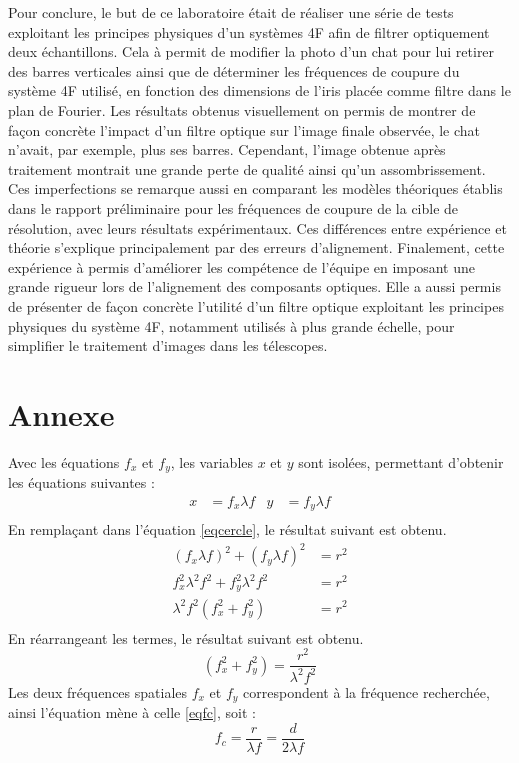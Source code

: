 \documentclass[11pt,letterpaper]{article}
\begin{document}
Pour conclure, le but de ce laboratoire était de réaliser une série de tests exploitant les principes physiques d'un systèmes 4F afin de filtrer optiquement deux échantillons. Cela à permit de modifier la photo d'un chat pour lui retirer des barres verticales ainsi que de déterminer les fréquences de coupure du système 4F utilisé, en fonction des dimensions de l'iris placée comme filtre dans le plan de Fourier. Les résultats obtenus visuellement on permis de montrer de façon concrète l'impact d'un filtre optique sur l'image finale observée, le chat n'avait, par exemple, plus ses barres. Cependant, l'image obtenue après traitement montrait une grande perte de qualité ainsi qu'un assombrissement. Ces imperfections se remarque aussi en comparant les modèles théoriques établis dans le rapport préliminaire pour les fréquences de coupure de la cible de résolution, avec leurs résultats expérimentaux. Ces différences entre expérience et théorie s'explique principalement par des erreurs d'alignement. Finalement, cette expérience à permis d'améliorer les compétence de l'équipe en imposant une grande rigueur lors de l'alignement des composants optiques. Elle a aussi permis de présenter de façon concrète l'utilité d'un filtre optique exploitant les principes physiques du système 4F, notamment utilisés à plus grande échelle, pour simplifier le traitement d'images dans les télescopes. 

\newpage\section*{Annexe}
Avec les équations $f_{x}$ et $f_{y}$, les variables $x$ et $y$ sont isolées, permettant d'obtenir les équations suivantes :
\begin{align*}
  x&=f_{x}\lambda f & y&=f_{y}\lambda f \\
\end{align*}
En remplaçant dans l'équation \ref{eqcercle}, le résultat suivant est obtenu.
\begin{align*}
  (f_{x}\lambda f)^{2}+(f_{y}\lambda f)^{2}&=r^{2} \\
  f_{x}^{2}\lambda^{2}f^{2}+f_{y}^{2}\lambda^{2}f^{2}&=r^{2} \\
  \lambda^{2}f^{2}(f_{x}^{2}+f_{y}^{2})&=r^{2} \\
\end{align*}
En réarrangeant les termes, le résultat suivant est obtenu.
\begin{equation*}
  (f_{x}^{2}+f_{y}^{2})=\frac{r^{2}}{\lambda^{2}f^{2}}
\end{equation*}
Les deux fréquences spatiales $f_{x}$ et $f_{y}$ correspondent à la fréquence recherchée, ainsi l'équation mène à celle \ref{eqfc}, soit :
\begin{equation*}
  f_{c}=\frac{r}{\lambda f}=\frac{d}{2\lambda f}
\end{equation*} 

\clearpage

% 
% 
\end{document}

